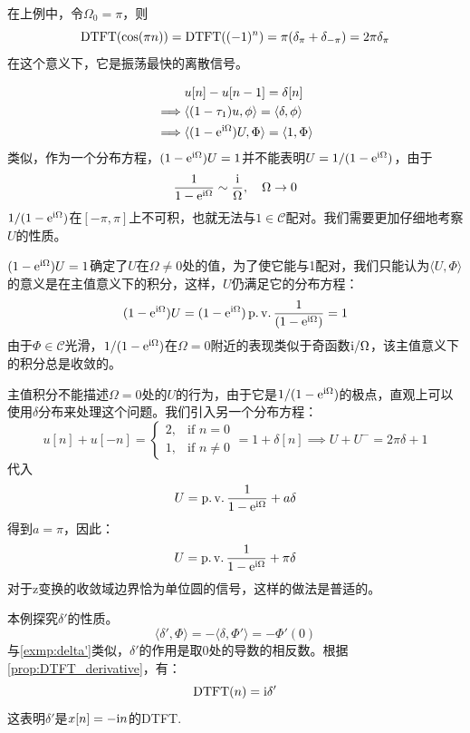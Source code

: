 在上例中，令$\Omega_0=\pi$，则
$$\operatorname{DTFT}(\cos(\pi n))=\operatorname{DTFT}((-1)^n)=\pi(\delta_\pi+\delta_{-\pi})=2\pi\delta_\pi$$
在这个意义下，它是振荡最快的离散信号。

\begin{example}[单位阶跃序列的离散时间傅里叶变换]
    \begin{align*}
                 & u[n]-u[n-1]=\delta[n]                                        \\
        \implies & \langle (1-\tau_1)u,\phi\rangle=\langle\delta,\phi\rangle    \\
        \implies & \langle(1-\mathrm{e}^{\mathrm{i}\Omega})U,\Phi\rangle=\langle 1,\Phi\rangle
    \end{align*}
    类似，作为一个分布方程，$(1-\mathrm{e}^{\mathrm{i}\Omega})U=1$并不能表明$U=1/(1-\mathrm{e}^{\mathrm{i}\Omega})$，由于
    $$\frac{1}{1-\mathrm{e}^{\mathrm{i}\Omega}}\sim\frac{\mathrm{i}}{\Omega},\quad \Omega\to 0$$
    $1/(1-\mathrm{e}^{\mathrm{i}\Omega})$在$[-\pi,\pi]$上不可积，也就无法与$1\in\mathcal{C}$配对。我们需要更加仔细地考察$U$的性质。

    $(1-\mathrm{e}^{\mathrm{i}\Omega})U=1$确定了$U$在$\Omega\neq 0$处的值，为了使它能与1配对，我们只能认为$\langle U,\Phi\rangle$的意义是在主值意义下的积分，这样，$U$仍满足它的分布方程：
    $$(1-\mathrm{e}^{\mathrm{i}\Omega})U=(1-\mathrm{e}^{\mathrm{i}\Omega})\operatorname{p.v.}\frac{1}{(1-\mathrm{e}^{\mathrm{i}\Omega})}=1$$
    由于$\Phi\in\mathcal{C}$光滑，$1/(1-\mathrm{e}^{\mathrm{i}\Omega})$在$\Omega=0$附近的表现类似于奇函数$\mathrm{i}/\Omega$，该主值意义下的积分总是收敛的。

    主值积分不能描述$\Omega=0$处的$U$的行为，由于它是$1/(1-\mathrm{e}^{\mathrm{i}\Omega})$的极点，直观上可以使用$\delta$分布来处理这个问题。我们引入另一个分布方程：
    $$u[n]+u[-n]=\begin{cases}
            2, & \text{if }n=0     \\
            1, & \text{if }n\neq 0
        \end{cases}=1+\delta[n]\implies U+U^-=2\pi\delta+1$$
    代入
    $$U=\operatorname{p.v.}\dfrac{1}{1-\mathrm{e}^{\mathrm{i}\Omega}}+a\delta$$
    得到$a=\pi$，因此：
    $$U=\operatorname{p.v.}\dfrac{1}{1-\mathrm{e}^{\mathrm{i}\Omega}}+\pi\delta$$
    对于z变换的收敛域边界恰为单位圆的信号，这样的做法是普适的。
\end{example}
\begin{example}
    本例探究$\delta'$的性质。
    $$\langle \delta',\Phi\rangle=-\langle\delta,\Phi'\rangle=-\Phi'(0)$$
    与\cref{exmp:delta'}类似，$\delta'$的作用是取$0$处的导数的相反数。根据\cref{prop:DTFT_derivative}，有：
    $$\operatorname{DTFT}(n)=\mathrm{i}\delta'$$
    这表明$\delta'$是$x[n]=-\mathrm{i} n$的DTFT.
\end{example}


